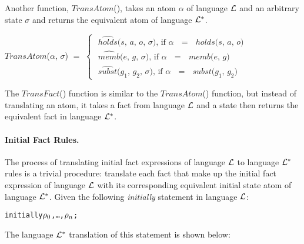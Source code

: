 \documentclass[11pt]{report}
\newenvironment{vverbatim}
{
  \begin{alltt}
}
{
    \vspace{-\baselineskip}
  \end{alltt}
}
\newenvironment{vquote}
{
  \begin{list}{}{\leftmargin 1em}\item[]
}
{
  \end{list}
}
\begin{document}
          Another function, $TransAtom$(), takes an atom $\alpha$ of language
          ${\cal L}$ and an arbitrary state $\sigma$ and returns the equivalent
          atom of language ${\cal L}^{*}$.

          \begin{vquote}
            $TransAtom$($\alpha$, $\sigma$)
            $=$
            \begin{math}
              \begin{cases}
                \mbox{
                  $\hat{holds}$($s$, $a$, $o$, $\sigma$),
                    if $\alpha$ $=$ $holds$($s$, $a$, $o$)
                } \\
                \mbox{
                  $\hat{memb}$($e$, $g$, $\sigma$),
                    if $\alpha$ $=$ $memb$($e$, $g$)
                } \\
                \mbox{
                  $\hat{subst}$($g_{1}$, $g_{2}$, $\sigma$),
                    if $\alpha$ $=$ $subst$($g_{1}$, $g_{2}$)
                }
              \end{cases}
            \end{math}
          \end{vquote}

          The $TransFact$() function is similar to the $TransAtom$()
          function, but instead of translating an atom, it takes a fact
          from language ${\cal L}$ and a state then returns the equivalent
          fact in language ${\cal L}^{*}$.

          \paragraph{Initial Fact Rules.}

            The process of translating initial fact expressions of language
            ${\cal L}$ to language ${\cal L}^{*}$ rules is a trivial procedure:
            translate each fact that make up the initial fact expression of
            language ${\cal L}$ with its corresponding equivalent initial state
            atom of language ${\cal L}^{*}$. Given the following
            {\em initially} statement in language ${\cal L}$:

            \begin{vverbatim}
  initially \(\rho\sb{0}\), \ldots, \(\rho\sb{n}\);
            \end{vverbatim}

            \noindent
            The language ${\cal L}^{*}$ translation of this statement is shown
            below:
\end{document}
